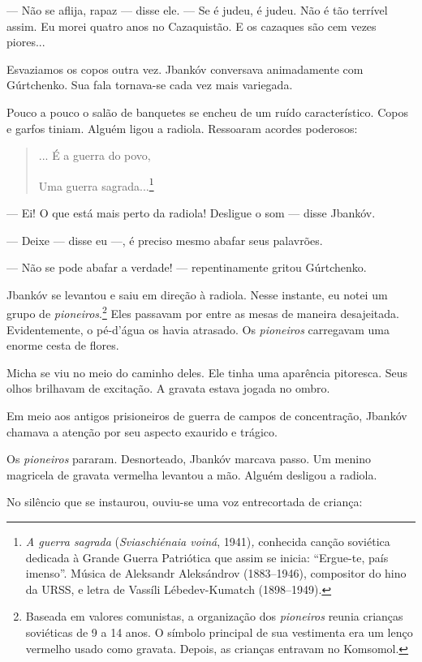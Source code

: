 --- Não se aflija, rapaz --- disse ele. --- Se é judeu, é judeu. Não é
tão terrível assim. Eu morei quatro anos no Cazaquistão. E os cazaques
são cem vezes piores...

Esvaziamos os copos outra vez. Jbankóv conversava animadamente com
Gúrtchenko. Sua fala tornava-se cada vez mais variegada.

Pouco a pouco o salão de banquetes se encheu de um ruído característico.
Copos e garfos tiniam. Alguém ligou a radiola. Ressoaram acordes
poderosos:

\begin{quote}
... É a guerra do povo,

Uma guerra sagrada...\footnote{\emph{A guerra sagrada}
  (\emph{Sviaschiénaia voiná}, 1941)\emph{,} conhecida canção soviética
  dedicada à Grande Guerra Patriótica que assim se inicia: ``Ergue-te,
  país imenso''. Música de Aleksandr Aleksándrov (1883--1946),
  compositor do hino da URSS, e letra de Vassíli Lébedev-Kumatch
  (1898--1949).}
\end{quote}

--- Ei! O que está mais perto da radiola! Desligue o som --- disse
Jbankóv.

--- Deixe --- disse eu ---, é preciso mesmo abafar seus palavrões.

--- Não se pode abafar a verdade! --- repentinamente gritou Gúrtchenko.

Jbankóv se levantou e saiu em direção à radiola. Nesse instante, eu
notei um grupo de \emph{pioneiros}.\footnote{Baseada em valores
  comunistas, a organização dos \emph{pioneiros} reunia crianças
  soviéticas de 9 a 14 anos. O símbolo principal de sua vestimenta era
  um lenço vermelho usado como gravata. Depois, as crianças entravam no
  Komsomol.} Eles passavam por entre as mesas de maneira desajeitada.
Evidentemente, o pé-d'água os havia atrasado. Os \emph{pioneiros}
carregavam uma enorme cesta de flores.

Micha se viu no meio do caminho deles. Ele tinha uma aparência
pitoresca. Seus olhos brilhavam de excitação. A gravata estava jogada no
ombro.

Em meio aos antigos prisioneiros de guerra de campos de concentração,
Jbankóv chamava a atenção por seu aspecto exaurido e trágico.

Os \emph{pioneiros} pararam. Desnorteado, Jbankóv marcava passo. Um
menino magricela de gravata vermelha levantou a mão. Alguém desligou a
radiola.

No silêncio que se instaurou, ouviu-se uma voz entrecortada de criança:

